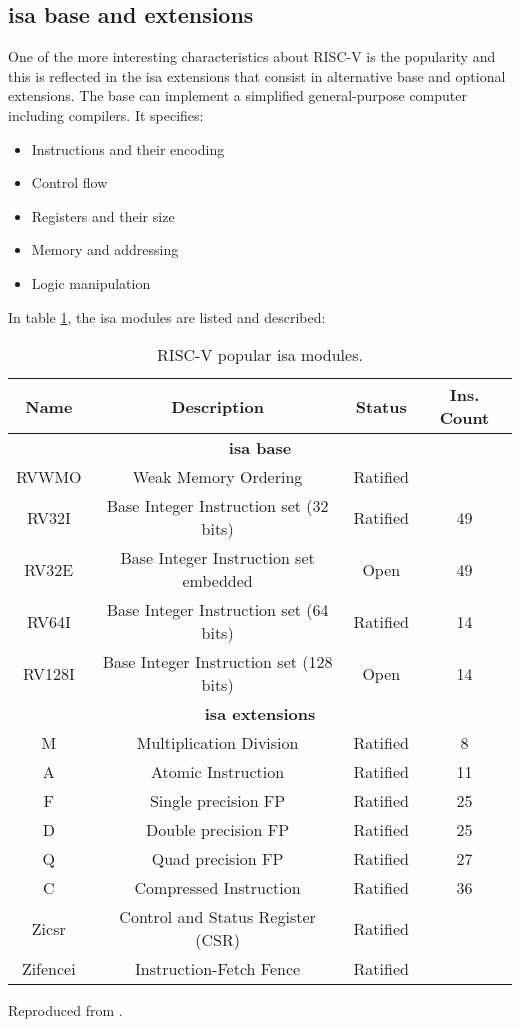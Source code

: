 \subsection{\acrshort{isa} base and extensions} 
One of the more interesting characteristics about RISC-V is the popularity and this is reflected in the \gls{isa} extensions that consist in alternative base and optional extensions. The base can implement a simplified general-purpose computer including compilers. It specifies: 

\begin{itemize}
	\item Instructions and their encoding
	\item Control flow
	\item Registers and their size
	\item Memory and addressing
	\item Logic manipulation
\end{itemize}

In table \ref{tab:isa}, the \gls{isa} modules are listed and described:

\begin{table}[H]
\centering
\begin{tabular}{|c|c|c|c|}
\hline
\textbf{Name} & \textbf{Description} & \textbf{Status}  & \textbf{Ins. Count}  \\ \hline

\multicolumn{4}{|c|}{\textbf{\gls{isa} base}} \\ \hline
RVWMO & Weak Memory Ordering & Ratified & \\ \hline
RV32I & Base Integer Instruction set (32 bits) & Ratified & 49 \\ \hline
RV32E & Base Integer Instruction set embedded & Open & 49 \\ \hline
RV64I & Base Integer Instruction set (64 bits) & Ratified & 14 \\ \hline
RV128I & Base Integer Instruction set (128 bits) & Open & 14 \\ \hline

\multicolumn{4}{|c|}{\textbf{\gls{isa} extensions}} \\ \hline

M & Multiplication Division & Ratified & 8\\ \hline
A & Atomic Instruction & Ratified & 11 \\ \hline
F & Single precision FP & Ratified & 25 \\ \hline
D & Double precision FP & Ratified & 25 \\ \hline
Q & Quad precision FP & Ratified & 27 \\ \hline
C & Compressed Instruction & Ratified & 36 \\ \hline
Zicsr & Control and Status Register (CSR) & Ratified &  \\ \hline
Zifencei & Instruction-Fetch Fence & Ratified & \\ \hline
\end{tabular}
\caption{RISC-V popular \gls{isa} modules.} Reproduced from \cite{riscvg}.
\label{tab:isa}
\end{table}

